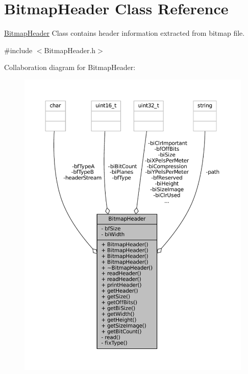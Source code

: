 \hypertarget{classBitmapHeader}{}\section{Bitmap\+Header Class Reference}
\label{classBitmapHeader}


\mbox{\hyperlink{classBitmapHeader}{Bitmap\+Header}} Class contains header information extracted from bitmap file.  




{\ttfamily \#include $<$Bitmap\+Header.\+h$>$}



Collaboration diagram for Bitmap\+Header\+:
\nopagebreak
\begin{figure}[H]
\begin{center}
\leavevmode
\includegraphics[width=350pt]{classBitmapHeader__coll__graph}
\end{center}
\end{figure}
